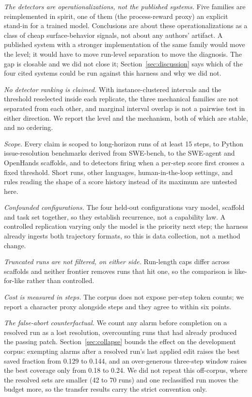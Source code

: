 \documentclass[sigconf,screen]{acmart}
\begin{document}
\emph{The detectors are operationalizations, not the published systems.} Five families are
reimplemented in spirit, one of them (the process-reward proxy) an explicit stand-in for a trained
model. Conclusions are about these operationalizations as a class of cheap surface-behavior signals,
not about any authors' artifact. A published system with a stronger implementation of the same
family would move the level; it would have to move run-level separation to move the diagnosis. The gap is
closable and we did not close it; Section~\ref{sec:discussion} says which of the four cited
systems could be run against this harness and why we did not.

\emph{No detector ranking is claimed.} With instance-clustered intervals and the threshold
reselected inside each replicate, the three mechanical families are not separated from each other,
and marginal interval overlap is not a pairwise test in either direction. We report the level and
the mechanism, both of which are stable, and no ordering.

\emph{Scope.} Every claim is scoped to long-horizon runs of at least 15 steps, to Python
issue-resolution benchmarks derived from SWE-bench, to the SWE-agent and OpenHands scaffolds, and to
detectors firing when a per-step score first crosses a fixed threshold. Short runs, other languages,
human-in-the-loop settings, and rules reading the shape of a score history instead of its maximum
are untested here.

\emph{Confounded configurations.} The four held-out configurations vary model, scaffold and task set
together, so they establish recurrence, not a capability law. A controlled
replication varying only the model is the priority next step; the harness already ingests both
trajectory formats, so this is data collection, not a method change.

\emph{Truncated runs are not filtered, on either side.} Run-length caps differ across scaffolds and
neither frontier removes runs that hit one, so the comparison is like-for-like rather than
controlled.

\emph{Cost is measured in steps.} The corpus does not expose per-step token counts; we report a
character proxy alongside steps and they agree to within six points.

\emph{The false-abort counterfactual.} We count any alarm before completion on a resolved run as a
lost resolution, overcounting runs that had already produced the passing patch.
Section~\ref{sec:collapse} bounds the effect on the development corpus: exempting alarms after a
resolved run's last applied edit raises the best saved fraction from 0.129 to 0.144, and an
over-generous three-step window raises the best coverage only from 0.18 to 0.24. We did not repeat
this off-corpus, where the resolved sets are smaller (42 to 70 runs) and one reclassified run moves
the budget more, so the transfer results carry the strict convention only.
\end{document}
